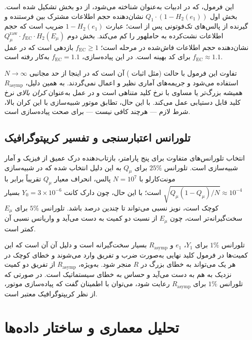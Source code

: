 این فرمول، که در ادبیات  به‌عنوان  شناخته می‌شود، از دو بخش تشکیل شده است. بخش اول $Q_1 \cdot (1 - H_2(e_1))$ نشان‌دهنده حجم اطلاعات مشترک بین فرستنده و گیرنده از پالس‌های تک‌فوتونی پس از  است؛ عبارت $1 - H_2(e_1)$ ضریب  است که حجم اطلاعات نشت‌کرده به حاملهور را کم می‌کند. بخش دوم $Q_\mu^{\text{raw}} \cdot f_{\text{EC}} \cdot H_2(E_\mu)$ نشان‌دهنده حجم اطلاعات فاش‌شده در مرحله  است؛ $f_{\text{EC}} \geq 1$ بازدهی  است که در عمل $f_{\text{EC}} \approx 1.1$ برای کد  بهینه است. در این پیاده‌سازی، $f_{\text{EC}} = 1.1$ به‌کار رفته است.

تفاوت این فرمول با حالت  (مثل اثبات ) آن است که در اینجا از حد مجانبی $N \to \infty$ استفاده می‌شود و جریمه‌های آماری نظیر  و  اعمال نمی‌گردند. به همین دلیل، $R_{\text{asymp}}$ همیشه بزرگ‌تر یا مساوی با نرخ کلید متناهی است و در عمل به‌عنوان \emph{کران بالای} نرخ کلید قابل دستیابی عمل می‌کند. با این حال، تطابق موتور شبیه‌سازی با این کران بالا، شرط لازم — هرچند کافی نیست — برای صحت پیاده‌سازی است.

\subsection{تلورانس اعتبارسنجی و تفسیر کریپتوگرافیک}

انتخاب تلورانس‌های متفاوت برای پنج پارامتر، بازتاب‌دهنده درک عمیق از فیزیک و آمار شبیه‌سازی است. تلورانس $25\%$ برای $Q_\mu$ به این دلیل انتخاب شده که در شبیه‌سازی مونت‌کارلو با $N = 10^7$ پالس، انحراف معیار $Q_\mu$ تقریباً برابر با $\sqrt{Q_\mu (1 - Q_\mu) / N} \approx 10^{-4}$ است؛ با این حال، چون دارک کانت $Y_0 = 3 \times 10^{-6}$ بسیار کوچک است، نویز نسبی می‌تواند تا چندین درصد باشد. تلورانس $5\%$ برای $E_\mu$ سخت‌گیرانه‌تر است، چون $E_\mu$ از نسبت دو کمیت به دست می‌آید و واریانس نسبی آن کمتر است.

تلورانس $1\%$ برای $Y_1$، $e_1$ و $R_{\text{asymp}}$ بسیار سخت‌گیرانه است و دلیل آن آن است که این کمیت‌ها در فرمول کلید نهایی به‌صورت ضرب و تفریق وارد می‌شوند و خطای کوچک در هر یک می‌تواند به خطای بزرگ در $R$ منجر شود. به‌ویژه، $R_{\text{asymp}}$ از تفریق دو کمیت نزدیک به هم به دست می‌آید و حساس به خطای سیستماتیک است. در صورتی که تلورانس $1\%$ برای $R_{\text{asymp}}$ رعایت شود، می‌توان با اطمینان گفت که پیاده‌سازی موتور، از نظر کریپتوگرافیک معتبر است.

\section{تحلیل معماری و ساختار داده‌ها}

